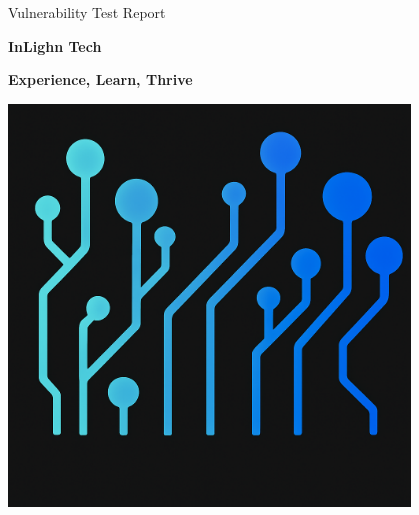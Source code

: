 \documentclass[10pt]{article}
\begin{document}

\begin{titlepage}
\pagecolor{exactbg}
\color{white}

\centering
\vspace*{3cm}
{\Huge Vulnerability Test Report\par}
\vspace{1cm}
{\Large\par}
\vspace{0.5cm}
{\Huge \textbf{InLighn Tech}\par}
{\Huge \textbf{Experience, Learn, Thrive}\par}

\vfill
\includegraphics[width=0.8\textwidth]{a.png}






\end{titlepage}
\end{document}
